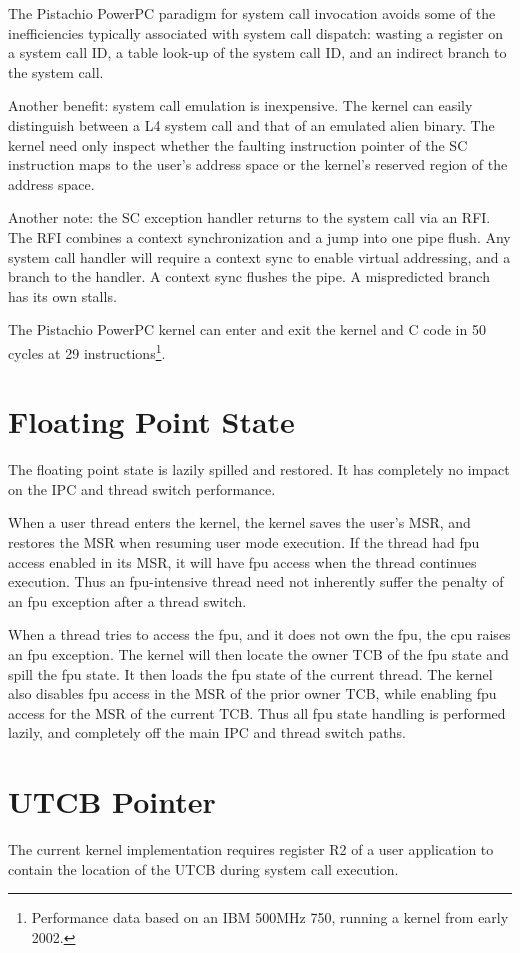 \documentclass[a4paper]{article}
\newcommand{\code}[1]{\textsf{#1}}
\newcommand{\MSR}{\code{MSR}}
\newcommand{\SC}{\code{SC}}
\newcommand{\RFI}{\code{RFI}}
\begin{document}
The Pistachio PowerPC paradigm for system call invocation avoids some of the 
inefficiencies typically associated with system call dispatch: wasting a 
register on a 
system call ID, a table look-up of the system call ID, and an indirect
branch to the system call.

Another benefit: system call emulation is inexpensive.  The kernel can
easily distinguish between a L4 system call and that of an emulated
alien binary.  The kernel need only inspect whether the faulting instruction
pointer of the \SC{} instruction maps to the user's address space or
the kernel's reserved region of the address space.

Another note: the \SC{} exception handler returns to the system call via
an \RFI{}.  The \RFI{} combines a context synchronization and a 
jump into one pipe flush.  Any system call handler will require a context 
sync to enable virtual addressing, and a branch to the handler.  A
context sync flushes the pipe.  A mispredicted branch has its own stalls.

The Pistachio PowerPC kernel can enter and exit the kernel and C code in
50 cycles at 29 instructions\footnote{Performance data based on an IBM 500MHz
750, running a kernel from early 2002.}.


\section{Floating Point State}
The floating point state is lazily spilled and restored.  It has completely 
no impact on the IPC and thread switch performance.

When a user thread enters the kernel, the kernel saves the user's \MSR{}, and
restores the \MSR{} when resuming user mode execution.  If the thread
had fpu access enabled in its \MSR{}, it will have fpu access when the thread
continues execution.  Thus an fpu-intensive thread need not inherently suffer
the penalty of an fpu exception after a thread switch.

When a thread tries to access the fpu, and it does not own the fpu, the
cpu raises an fpu exception.  The kernel will then locate the owner TCB of
the fpu state and spill the fpu state.  It then loads the
fpu state of the current thread.  The kernel also disables fpu access in
the \MSR{} of the prior owner TCB, while enabling fpu access for the \MSR{} 
of the current TCB.  Thus all fpu state handling is performed lazily, and
completely off the main IPC and thread switch paths.


\section{UTCB Pointer}
The current kernel implementation requires register R2 of a user application
to contain the location of the UTCB during system call execution.
\end{document}
